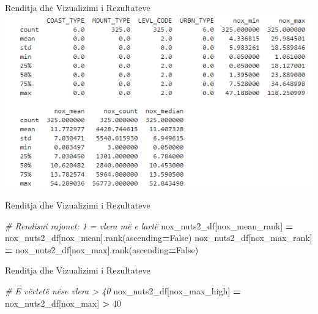 \documentclass[
  ignorenonframetext,
]{beamer}
\newenvironment{Shaded}{\begin{snugshade}}{\end{snugshade}}
\newcommand{\CommentTok}[1]{\textcolor[rgb]{0.56,0.35,0.01}{\textit{#1}}}
\newcommand{\DecValTok}[1]{\textcolor[rgb]{0.00,0.00,0.81}{#1}}
\newcommand{\NormalTok}[1]{#1}
\newcommand{\OperatorTok}[1]{\textcolor[rgb]{0.81,0.36,0.00}{\textbf{#1}}}
\newcommand{\StringTok}[1]{\textcolor[rgb]{0.31,0.60,0.02}{#1}}
\newcommand{\VariableTok}[1]{\textcolor[rgb]{0.00,0.00,0.00}{#1}}
\begin{document}
\begin{frame}{Renditja dhe Vizualizimi i Rezultateve}
\protect\hypertarget{renditja-dhe-vizualizimi-i-rezultateve-3}{}
\includegraphics{./Figs/eunox.png}
\end{frame}

\begin{frame}[fragile]{Renditja dhe Vizualizimi i Rezultateve}
\protect\hypertarget{renditja-dhe-vizualizimi-i-rezultateve-4}{}

\begin{Shaded}
\begin{Highlighting}[]
\CommentTok{\# Rendisni rajonet: 1 = vlera më e lartë}
\NormalTok{nox\_nuts2\_df[}\StringTok{\textquotesingle{}nox\_mean\_rank\textquotesingle{}}\NormalTok{] }\OperatorTok{=}\NormalTok{ nox\_nuts2\_df[}\StringTok{\textquotesingle{}nox\_mean\textquotesingle{}}\NormalTok{].rank(ascending}\OperatorTok{=}\VariableTok{False}\NormalTok{)}
\NormalTok{nox\_nuts2\_df[}\StringTok{\textquotesingle{}nox\_max\_rank\textquotesingle{}}\NormalTok{] }\OperatorTok{=}\NormalTok{ nox\_nuts2\_df[}\StringTok{\textquotesingle{}nox\_max\textquotesingle{}}\NormalTok{].rank(ascending}\OperatorTok{=}\VariableTok{False}\NormalTok{)}
\end{Highlighting}
\end{Shaded}
\end{frame}

\begin{frame}[fragile]{Renditja dhe Vizualizimi i Rezultateve}
\protect\hypertarget{renditja-dhe-vizualizimi-i-rezultateve-5}{}

\begin{Shaded}
\begin{Highlighting}[]
\CommentTok{\# E vërtetë nëse vlera \textgreater{} 40}
\NormalTok{nox\_nuts2\_df[}\StringTok{\textquotesingle{}nox\_max\_high\textquotesingle{}}\NormalTok{] }\OperatorTok{=}\NormalTok{ nox\_nuts2\_df[}\StringTok{\textquotesingle{}nox\_max\textquotesingle{}}\NormalTok{] }\OperatorTok{\textgreater{}} \DecValTok{40}
\end{Highlighting}
\end{Shaded}
\end{frame}
\end{document}
